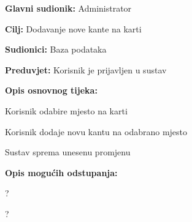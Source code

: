 				
				\noindent {}
					\begin{packed_item}
	
						\item \textbf{Glavni sudionik: }Administrator
						\item  \textbf{Cilj:} Dodavanje nove kante na karti
						\item  \textbf{Sudionici:} Baza podataka
						\item  \textbf{Preduvjet:} Korisnik je prijavljen u sustav
						\item  \textbf{Opis osnovnog tijeka:}
						
						\item[] \begin{packed_enum}
	
							\item Korisnik odabire mjesto na karti
							\item Korisnik dodaje novu kantu na odabrano mjesto
							\item Sustav sprema unesenu promjenu	
						\end{packed_enum}
						
						\item  \textbf{Opis mogućih odstupanja:}
						
						\item[] \begin{packed_item}
	
							\item[2.a] ?
							
							\item[] \begin{packed_enum}
								
								\item ?
								
							\end{packed_enum}
							
							
						\end{packed_item}
					\end{packed_item}
				
